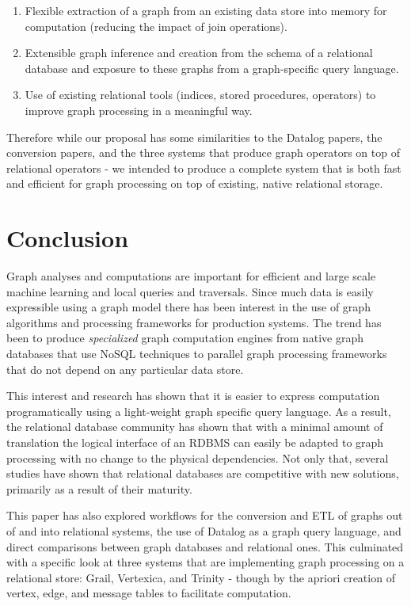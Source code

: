 \documentclass[11pt,letterpaper]{article}
\begin{document}
\begin{enumerate}
	\item Flexible extraction of a graph from an existing data store into memory for computation (reducing the impact of join operations).
	\item Extensible graph inference and creation from the schema of a relational database and exposure to these graphs from a graph-specific query language.
	\item Use of existing relational tools (indices, stored procedures, operators) to improve graph processing in a meaningful way.
\end{enumerate}

Therefore while our proposal has some similarities to the Datalog papers, the conversion papers, and the three systems that produce graph operators on top of relational operators - we intended to produce a complete system that is both fast and efficient for graph processing on top of existing, native relational storage.

\section*{Conclusion}

Graph analyses and computations are important for efficient and large scale machine learning and local queries and traversals. Since much data is easily expressible using a graph model there has been interest in the use of graph algorithms and processing frameworks for production systems. The trend has been to produce \textit{specialized} graph computation engines from native graph databases that use NoSQL techniques to parallel graph processing frameworks that do not depend on any particular data store.

This interest and research has shown that it is easier to express computation programatically using a light-weight graph specific query language. As a result, the relational database community has shown that with a minimal amount of translation the logical interface of an RDBMS can easily be adapted to graph processing with no change to the physical dependencies. Not only that, several studies have shown that relational databases are competitive with new solutions, primarily as a result of their maturity.

This paper has also explored workflows for the conversion and ETL of graphs out of and into relational systems, the use of Datalog as a graph query language, and direct comparisons between graph databases and relational ones. This culminated with a specific look at three systems that are implementing graph processing on a relational store: Grail, Vertexica, and Trinity - though by the apriori creation of vertex, edge, and message tables to facilitate computation.
\end{document}
